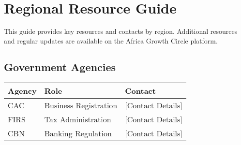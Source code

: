 
\chapter{Regional Resource Guide}

\begin{importantbox}
    This guide provides key resources and contacts by region. Additional resources and regular updates are available on the Africa Growth Circle platform.
\end{importantbox}


\section{Government Agencies}
\begin{center}
    \begin{tabular}{p{}|p{}|p{}}
        \textbf{Agency} & \textbf{Role}         & \textbf{Contact}  \\
        \hline
        CAC             & Business Registration & [Contact Details] \\
        FIRS            & Tax Administration    & [Contact Details] \\
        CBN             & Banking Regulation    & [Contact Details] \\
    \end{tabular}
\end{center}